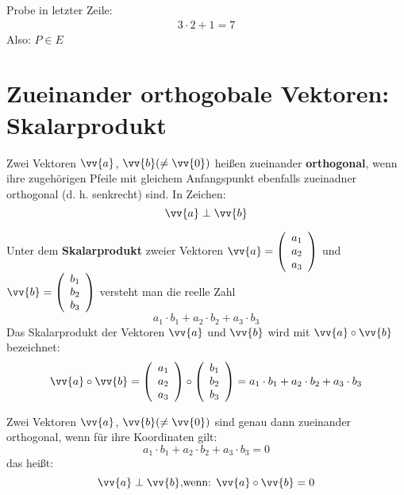 Probe in letzter Zeile:
\begin{gather*}
    3 \cdot 2 + 1 = 7
\end{gather*}
Also: $P \in E$

\section{Zueinander orthogobale Vektoren: Skalarprodukt}

\begin{definition}
    Zwei Vektoren $\vv{a}$, $\vv{b} (\neq \vv{0})$  heißen zueinander \textbf{orthogonal}, wenn ihre zugehörigen Pfeile mit gleichem Anfangspunkt ebenfalls zueinadner orthogonal (d. h. senkrecht) sind. In Zeichen: 
    $$\vv{a} \perp \vv{b}$$
\end{definition}

\begin{definition}
    Unter dem \textbf{Skalarprodukt} zweier Vektoren $\vv{a} = \left(\begin{array}{c}  a_1 \\ a_2 \\ a_3 \end{array}\right)$ und \\ $\vv{b} = \left(\begin{array}{c}  b_1 \\ b_2 \\ b_3 \end{array}\right)$ versteht man die reelle Zahl 
    $$a_1 \cdot b_1 + a_2 \cdot b_2 + a_3 \cdot b_3$$
    Das Skalarprodukt der Vektoren $\vv{a}$ und $\vv{b}$ wird mit $\vv{a} \circ \vv{b}$ bezeichnet:
    $$\vv{a} \circ \vv{b} = \left(\begin{array}{c}  a_1 \\ a_2 \\ a_3 \end{array}\right) \circ \left(\begin{array}{c}  b_1 \\ b_2 \\ b_3 \end{array}\right) = a_1 \cdot b_1 + a_2 \cdot b_2 + a_3 \cdot b_3$$
\end{definition}

\begin{satz}[Orthogonalitätskriterium]
    Zwei Vektoren $\vv{a}$, $\vv{b} (\neq \vv{0})$ sind genau dann zueinander orthogonal, wenn für ihre Koordinaten gilt:
    $$a_1 \cdot b_1 + a_2 \cdot b_2 + a_3 \cdot b_3 = 0$$
    das heißt:
    $$\vv{a} \perp \vv{b} \text{,wenn: } \vv{a} \circ \vv{b} = 0$$
\end{satz}


